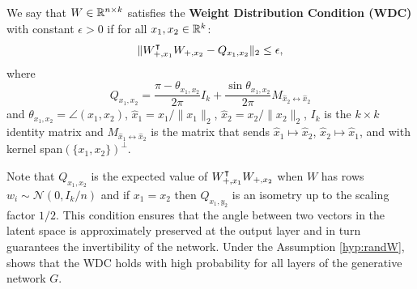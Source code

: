 \begin{definition}\label{def:WDC}
	We say that $W \in \mathbb{R}^{n \times k}$ satisfies the \textbf{Weight Distribution Condition (WDC)} with constant $\epsilon > 0$ if for all $x_1, x_2 \in \mathbb{R}^k$:
	\[
	\| W_{+,x_1}^\intercal W_{+,x_2} - Q_{x_1,x_2}\|_2 \leq \epsilon,
	\] 
	where
	\[
	Q_{x_1,x_2} = \frac{\pi - \theta_{x_1,x_2}}{2 \pi} I_k + \frac{\sin \theta_{x_1,x_2}}{2 \pi} M_{\hat{x}_2\leftrightarrow \hat{x}_2}
	\]
	and $\theta_{x_1,x_2} = \angle (x_1,x_2)$, $\hat{x}_1 = x_1/\|x_1\|_2$, $\hat{x}_2 = x_2/\|x_2\|_2$, $I_k$ is the $k\times k$ identity matrix and $M_{\hat{x}_1\leftrightarrow \hat{x}_2}$ is the matrix that sends $\hat{x}_1 \mapsto \hat{x}_2$, $\hat{x}_2 \mapsto \hat{x}_1$, and with kernel span$(\{x_1,x_2\})^\perp$.
\end{definition}

Note that $Q_{x_1,x_2}$ is the expected value of $W_{+,x_1}^\intercal W_{+,x_2}$ when $W$ has rows $w_i \sim \mathcal{N}(0,I_k/n)$ and if $x_1 = x_2$ then $Q_{x_1,y_2}$ is an isometry up to the scaling factor $1/2$. 
This condition ensures that the angle between two 
vectors in the latent space is approximately preserved at the output layer and in turn guarantees the invertibility of the network. Under the Assumption \ref{hyp:randW}, \cite{hand2017global} shows that the WDC holds with high probability for all layers of the generative network $G$.


